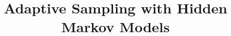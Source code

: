 \documentclass{article} %
\title{Adaptive Sampling with Hidden Markov Models}
\author{
  
}
\begin{document}
\maketitle

\begin{abstract}
  
\end{abstract}




%
%
\end{document}
